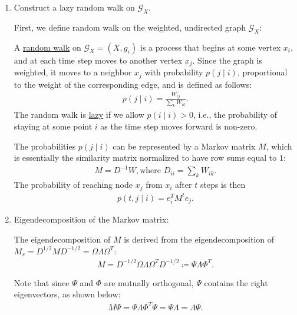 \begin{enumerate}
\item Construct a lazy random walk on $\mathcal{G}_X$. 

First, we define random walk on the weighted, undirected graph $\mathcal{G}_X$: 

\begin{defn}
A \underline{random walk} on $\mathcal{G}_X = (X,g_\epsilon)$ is a process that begins at some vertex $x_i$, and at each time step moves to another vertex $x_j$. Since the graph is weighted, it moves to a neighbor $x_j$ with probability $p(j \mid i)$, proportional to the weight of the corresponding edge, and is defined as follows:
\begin{align}
        p(j\mid i) = \frac{W_{i j}}{\sum_{k} W_{i k}}.
\end{align}
The random walk is \underline{lazy} if we allow $p(i\mid i) > 0$, i.e., the probability of staying at some point $i$ as the time step moves forward is non-zero.
\end{defn}
    
    The probabilities $p(j \mid i)$ can be represented by a Markov matrix $M$, which is essentially the similarity matrix normalized to have row sums equal to $1$:
     \begin{align}
        M = D^{-1} W, \text{where } D_{i i} =\sum_{k}W_{i k}.
    \end{align}
    The probability of reaching node $x_j$ from $x_i$ after $t$ steps is then
    \begin{align}
        p(t,j\mid i) = e_i^T M^t e_j.
    \end{align}

    \item Eigendecomposition of the Markov matrix:
    
    The eigendecomposition of $M$ is derived from the eigendecomposition of $M_s = D^{1/2} M D^{-1/2} = \Omega \Lambda \Omega^T$:
    \begin{align}
        M = D^{-1/2}  \Omega \Lambda \Omega^T D^{-1/2} \coloneqq \Psi \Lambda \Phi^T.
    \end{align}
    
    Note that since $\Psi$ and $\Phi$ are mutually orthogonal, $\Psi$ contains the right eigenvectors, as shown below:
     \begin{align}
        M \Psi =  \Psi \Lambda \Phi^T \Psi = \Psi \Lambda =  \Lambda \Psi.
    \end{align}
    

\end{enumerate}
